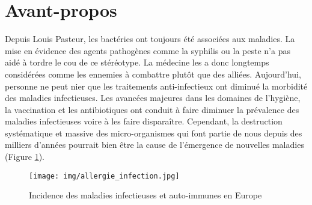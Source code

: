 \documentclass[12pt,a4paper]{article}
\begin{document}
 \newpage
\section{Avant-propos}

Depuis Louis Pasteur, les bactéries ont toujours été associées aux maladies. La mise en évidence des agents pathogènes comme la syphilis ou la peste n'a pas aidé à tordre le cou de ce stéréotype. La médecine les a donc longtemps considérées comme les ennemies à combattre plutôt que des alliées.
Aujourd'hui, personne ne peut nier que les traitements anti-infectieux ont diminué la morbidité des maladies infectieuses.
Les avancées majeures dans les domaines de l'hygiène, la vaccination et les antibiotiques ont conduit à faire diminuer la prévalence des maladies infectieuses voire à les faire disparaître. Cependant, la destruction systématique et massive des micro-organismes qui font partie de nous depuis des milliers d'années pourrait bien être la cause de l'émergence de nouvelles maladies\cite{Bach2002} (Figure \ref{hyigienisme}).


\begin{figure}[ht]
\begin{center}
\texttt{[image: img/allergie\_infection.jpg]}\hfill
\end{center}
\caption{Incidence des maladies infectieuses et auto-immunes en Europe }
\label{hyigienisme}
\end{figure}
\end{document}
